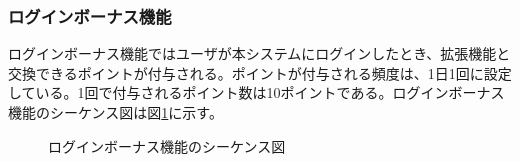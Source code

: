 \documentclass[a4j]{jarticle}
\begin{document}
  \subsubsection{ログインボーナス機能}
  ログインボーナス機能ではユーザが本システムにログインしたとき、拡張機能と交換できるポイントが付与される。ポイントが付与される頻度は、1日1回に設定している。1回で付与されるポイント数は10ポイントである。ログインボーナス機能のシーケンス図は図\ref{fig:login_login-bonus.png}に示す。
  \begin{figure}[H]
    \centering
    \caption{ログインボーナス機能のシーケンス図}
    \label{fig:login_login-bonus.png}
  \end{figure}
\end{document}
